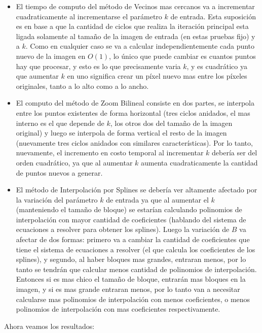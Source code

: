 \documentclass{article}
\begin{document}
\begin{itemize}
\item El tiempo de computo del método de Vecinos mas cercanos va a incrementar cuadraticamente al incrementarse el parámetro $k$ de entrada. Esta suposición es en base a que la cantidad de ciclos que realiza la iteración principal esta ligada solamente al tamaño de la imagen de entrada (en estas pruebas fijo) y a $k$. Como en cualquier caso se va a calcular independientemente cada punto nuevo de la imagen en $O(1)$, lo único que puede cambiar es cuantos puntos hay que procesar, y esto es lo que precisamente varia $k$, y es cuadrático ya que aumentar $k$ en uno significa crear un píxel nuevo mas entre los píxeles originales, tanto a lo alto como a lo ancho. 
\item El computo del método de Zoom Bilineal consiste en dos partes, se interpola entre los puntos existentes de forma horizontal (tres ciclos anidados, el mas interno es el que depende de $k$, los otros dos del tamaño de la imagen original) y luego se interpola de forma vertical el resto de la imagen (nuevamente tres ciclos anidados con similares características). Por lo tanto, nuevamente, el incremento en costo temporal al incrementar $k$ debería ser del orden cuadrático, ya que al aumentar $k$ aumenta cuadraticamente la cantidad de puntos nuevos a generar.
\item El método de Interpolación por Splines se debería ver altamente afectado por la variación del parámetro $k$ de entrada ya que al aumentar el $k$ (manteniendo el tamaño de bloque) se estarían calculando polinomios de interpolación con mayor cantidad de coeficientes (hablando del sistema de ecuaciones a resolver para obtener los splines). Luego la variación de $B$ va afectar de dos formas: primero va a cambiar la cantidad de coeficientes que tiene el sistema de ecuaciones a resolver (el que calcula los coeficientes de los splines), y segundo, al haber bloques mas grandes, entraran menos, por lo tanto se tendrán que calcular menos cantidad de polinomios de interpolación. 
Entonces si es mas chico el tamaño de bloque, entrarán mas bloques en la imagen, y si es mas grande entraran menos, por lo tanto van a necesitar calcularse mas polinomios de interpolación con menos coeficientes, o menos polinomios de interpolación con mas coeficientes respectivamente.
\end{itemize}
Ahora veamos los resultados:
\end{document}
